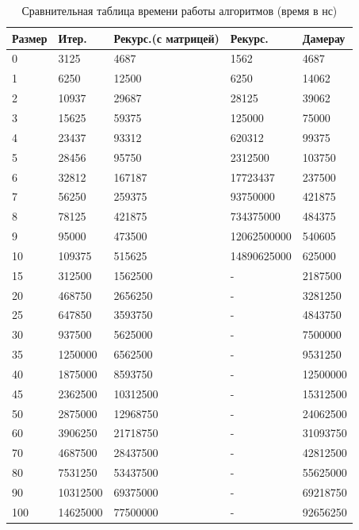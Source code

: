 \begin{table}[!ht]
  \caption{Сравнительная таблица времени работы алгоритмов (время в нс)}
  \centering
\begin{tabular}{ | l | l | l | l | l |}
\hline
Размер & Итер. & Рекурс.(с матрицей)  & Рекурс. & Дамерау \\ \hline
0 & 3125 & 4687 & 1562 & 4687\\
1 & 6250 & 12500 & 6250 & 14062 \\
2 & 10937 & 29687 & 28125 & 39062 \\
3 & 15625 & 59375 & 125000 & 75000\\ 
4 & 23437 & 93312 & 620312 & 99375 \\
5 & 28456 & 95750 & 2312500 & 103750 \\
6 & 32812 & 167187 & 17723437 & 237500\\ 
7 & 56250 & 259375 & 93750000 & 421875\\
8 & 78125 & 421875 & 734375000 & 484375\\
9 & 95000 & 473500 & 12062500000 & 540605\\
10 & 109375 & 515625 & 14890625000 & 625000\\
15 & 312500 & 1562500 & - & 2187500 \\
20 & 468750 & 2656250 & - & 3281250 \\
25 & 647850 & 3593750 & - & 4843750\\
30 & 937500 & 5625000 & - & 7500000\\
35 & 1250000 & 6562500 & - & 9531250 \\
40 & 1875000 & 8593750 & - & 12500000 \\
45 & 2362500 & 10312500 & - & 15312500 \\
50 & 2875000 & 12968750 & - & 24062500 \\
60 & 3906250 & 21718750 & - & 31093750 \\
70 & 4687500 & 28437500 & - & 42812500 \\
80 & 7531250 & 53437500 & - & 55625000 \\
90 & 10312500 & 69375000 & - & 69218750 \\
100 & 14625000 & 77500000 & - & 92656250 \\
\hline
\end{tabular}
\end{table}



\clearpage


